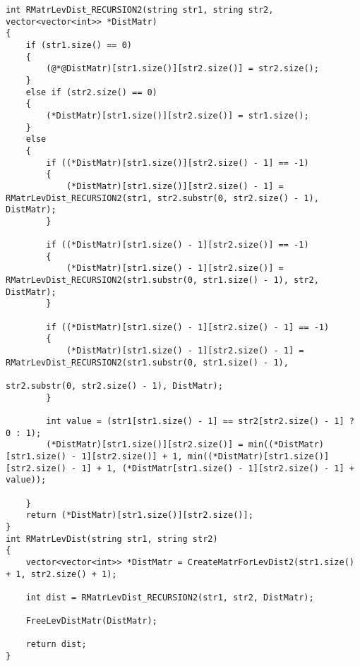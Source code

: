 \documentclass[utf8x, 12pt]{G7-32}
\begin{document}
\begin{lstlisting}[label=levrecmatr,caption=Функция нахождения расстояния Левенштейна рекурсивно с матрицей, escapechar=@]
int RMatrLevDist_RECURSION2(string str1, string str2, vector<vector<int>> *DistMatr)
{
    if (str1.size() == 0)
    {
        (@*@DistMatr)[str1.size()][str2.size()] = str2.size();
    }
    else if (str2.size() == 0)
    {
        (*DistMatr)[str1.size()][str2.size()] = str1.size();
    }
    else
    {
        if ((*DistMatr)[str1.size()][str2.size() - 1] == -1)
        {
            (*DistMatr)[str1.size()][str2.size() - 1] = RMatrLevDist_RECURSION2(str1, str2.substr(0, str2.size() - 1), DistMatr);
        }

        if ((*DistMatr)[str1.size() - 1][str2.size()] == -1)
        {
            (*DistMatr)[str1.size() - 1][str2.size()] = RMatrLevDist_RECURSION2(str1.substr(0, str1.size() - 1), str2, DistMatr);
        }

        if ((*DistMatr)[str1.size() - 1][str2.size() - 1] == -1)
        {
            (*DistMatr)[str1.size() - 1][str2.size() - 1] = RMatrLevDist_RECURSION2(str1.substr(0, str1.size() - 1),
															str2.substr(0, str2.size() - 1), DistMatr);
        }

        int value = (str1[str1.size() - 1] == str2[str2.size() - 1] ? 0 : 1);
        (*DistMatr)[str1.size()][str2.size()] = min((*DistMatr)[str1.size() - 1][str2.size()] + 1, min((*DistMatr)[str1.size()][str2.size() - 1] + 1, (*DistMatr[str1.size() - 1][str2.size() - 1] + value));

    }
    return (*DistMatr)[str1.size()][str2.size()];
}
int RMatrLevDist(string str1, string str2)
{
    vector<vector<int>> *DistMatr = CreateMatrForLevDist2(str1.size() + 1, str2.size() + 1);

    int dist = RMatrLevDist_RECURSION2(str1, str2, DistMatr);

    FreeLevDistMatr(DistMatr);

    return dist;
}

\end{lstlisting}
\end{document}
